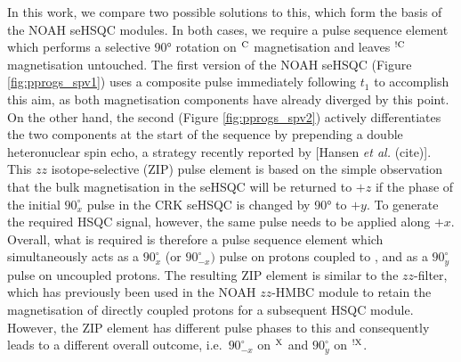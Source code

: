 \documentclass[11pt]{article}
\newcommand*{\hl}[1]{\textcolor{WildStrawberry}{#1}}
\newcommand*{\carbon}{\ce{^{13}C}}
\newcommand*{\proton}{\ce{^{1}H}}
\newcommand*{\magn}[1]{\ce{^1H}$^{#1}$}
\newcommand*{\magnnot}[1]{\ce{^1H}$^{!#1}$}
\newcommand*{\figref}[1]{Figure \ref{fig:#1}}
\begin{document}
\hl{
In this work, we compare two possible solutions to this, which form the basis of the NOAH seHSQC modules.
In both cases, we require a pulse sequence element which performs a selective \ang{90} rotation on \magn{\ce{C}} magnetisation and leaves \magnnot{\ce{C}} magnetisation untouched.
The first version of the NOAH seHSQC (\figref{pprogs_spv1}) uses a composite \proton{} pulse immediately following $t_1$ to accomplish this aim, as both magnetisation components have already diverged by this point.
On the other hand, the second (\figref{pprogs_spv2}) actively differentiates the two components at the start of the sequence by prepending a double heteronuclear spin echo, a strategy recently reported by [Hansen \textit{et al.} (cite)].
This $zz$ isotope-selective (ZIP) pulse element is based on the simple observation that the bulk magnetisation in the seHSQC will be returned to $+z$ if the phase of the initial \proton{} $90^\circ_{x}$ pulse in the CRK seHSQC is changed by \ang{90} to $+y$.
To generate the required HSQC signal, however, the same pulse needs to be applied along $+x$.
Overall, what is required is therefore a pulse sequence element which simultaneously acts as a $90^\circ_x$ (or $90^\circ_{-x})$ pulse on protons coupled to \carbon{}, and as a $90^\circ_y$ pulse on uncoupled protons.
The resulting ZIP element is similar to the $zz$-filter, which has previously been used in the NOAH $zz$-HMBC module to retain the magnetisation of directly coupled protons for a subsequent HSQC module.\autocite{Kupce2018CC, Kupce2019JMR}
However, the ZIP element has different pulse phases to this and consequently leads to a different overall outcome, i.e.\ $90^\circ_{-x}$ on \magn{\ce{X}} and $90^\circ_y$ on \magnnot{\ce{X}}.
}
\end{document}
